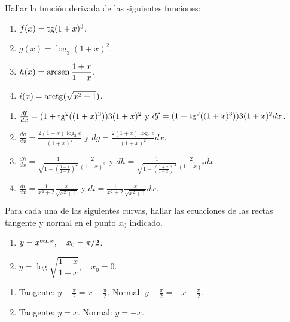 {Hallar la función derivada de las siguientes funciones:
\begin{multicols}{2}
\begin{enumerate}
\item $f(x)=\operatorname{tg}(1+x)^3$.
\item $g(x)=\log_{3}(1+x)^2$.
\item $h(x)=\operatorname{arcsen}\dfrac{1+x}{1-x}$.
\item $i(x)= \operatorname{arctg}(\sqrt{x^2+1})$.
\end{enumerate}
\end{multicols}
}
{\begin{enumerate}
\item $\frac{df}{dx} = (1 + \operatorname{tg}^2((1+x)^3))3(1+x)^2$ y $df = (1 + \operatorname{tg}^2((1+x)^3))3(1+x)^2 dx$.
\item $\frac{dg}{dx} = \frac{2(1+x)\log_3e}{(1+x)^2}$ y $dg = \frac{2(1+x)\log_3e}{(1+x)^2} dx$.
\item $\frac{dh}{dx} = \frac{1}{\sqrt{1-\left(\frac{1+x}{1-x}\right)^2}}\frac{2}{(1-x)^2}$ y $dh = \frac{1}{\sqrt{1-\left(\frac{1+x}{1-x}\right)^2}}\frac{2}{(1-x)^2} dx$.
\item $\frac{di}{dx} = \frac{1}{x^2+2}\frac{x}{\sqrt{x^2+1}}$ y $di = \frac{1}{x^2+2}\frac{x}{\sqrt{x^2+1}} dx$.
\end{enumerate}
}
{
}


{Para cada una de las siguientes curvas, hallar las ecuaciones de las rectas tangente y normal en el punto $x_{0}$ indicado.
\begin{multicols}{2}
\begin{enumerate}
\item  $y=x^{\operatorname{sen} x},\quad x_{0}=\pi/2$.
\item  $y=\log \sqrt{\dfrac{1+x}{1-x}}, \quad x_{0}=0$.
\end{enumerate}
\end{multicols}
}
{\begin{enumerate}
\item Tangente: $y-\frac{\pi}{2} = x-\frac{\pi}{2}$. Normal: $y-\frac{\pi}{2} = -x+\frac{\pi}{2}$.
\item Tangente: $y = x$. Normal: $y = -x$.
\end{enumerate}
}
{
}


